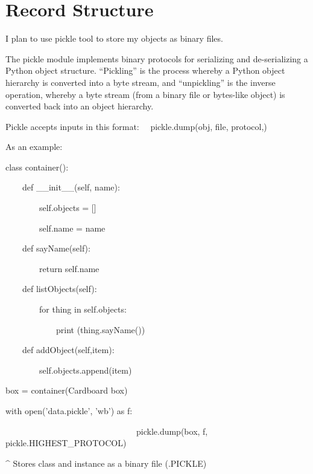 \documentclass{article}
\begin{document}
\bigskip


\bigskip

\section{Record Structure}


\bigskip

I plan to use pickle tool to store my objects as binary files.

The pickle module implements binary protocols for serializing and de-serializing a Python object structure. ``Pickling'' is the process whereby a Python object hierarchy is converted into a byte stream, and ``unpickling'' is the inverse operation, whereby a byte stream (from a binary file or bytes-like object) is converted back into an object hierarchy.

Pickle accepts inputs in this format: \ \ pickle.dump(obj, file, protocol,)

As an example: \ 


\bigskip

class container():

\ \ \ \ def \_\_init\_\_(self, name):

\ \ \ \ \ \ \ \ self.objects = []

\ \ \ \ \ \ \ \ self.name = name


\bigskip

\ \ \ \ def sayName(self):

\ \ \ \ \ \ \ \ return self.name


\bigskip

\ \ \ \ def listObjects(self):

\ \ \ \ \ \ \ \ for thing in self.objects:

\ \ \ \ \ \ \ \ \ \ \ \ print (thing.sayName())


\bigskip

\ \ \ \ def addObject(self,item):

\ \ \ \ \ \ \ \ self.objects.append(item)


\bigskip

box = container({\textquotedbl}Cardboard box{\textquotedbl})

with open('data.pickle', 'wb') as f:

\ \ \ \ \ \ \ \ \ \ \ \ \ \ \ \ \ \ \ \ \ \ \ \ \ \ \ \ \ \ \ pickle.dump(box, f, pickle.HIGHEST\_PROTOCOL)


\bigskip

\^{} Stores class and instance as a binary file (.PICKLE)
\end{document}
